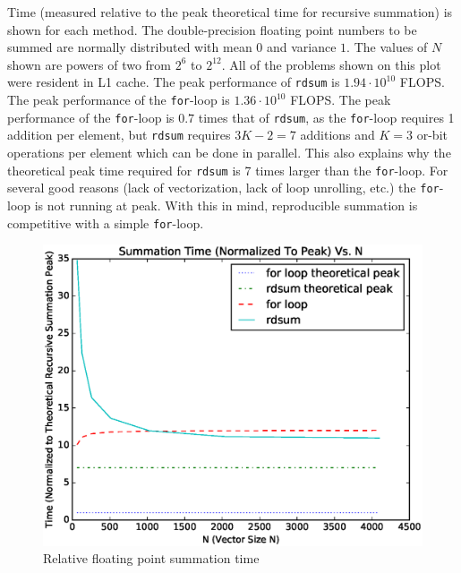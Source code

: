   Time (measured relative to the peak theoretical time for recursive summation) is shown for each method. The double-precision floating point numbers to be summed are normally distributed with mean $0$ and variance $1$. The values of $N$ shown are powers of two from $2^6$ to $2^{12}$. All of the problems shown on this plot were resident in L1 cache. The peak performance of \texttt{rdsum} is $1.94\cdot 10^{10}$ FLOPS. The peak performance of the \texttt{for}-loop is $1.36\cdot 10^{10}$ FLOPS. The peak performance of the \texttt{for}-loop is $0.7$ times that of \texttt{rdsum}, as the \texttt{for}-loop requires 1 addition per element, but \texttt{rdsum} requires $3K - 2 = 7$ additions and $K = 3$ or-bit operations per element which can be done in parallel. This also explains why the theoretical peak time required for \texttt{rdsum} is 7 times larger than the \texttt{for}-loop. For several good reasons (lack of vectorization, lack of loop unrolling, etc.) the \texttt{for}-loop is not running at peak. With this in mind, reproducible summation is competitive with a simple \texttt{for}-loop.
  \begin{figure}[H]
  \begin{center}
  \includegraphics[width=\textwidth]{plots/sum_comparison}
  \caption{Relative floating point summation time}
  \label{fig:forloop_timings}
  \end{center}
  \end{figure}
